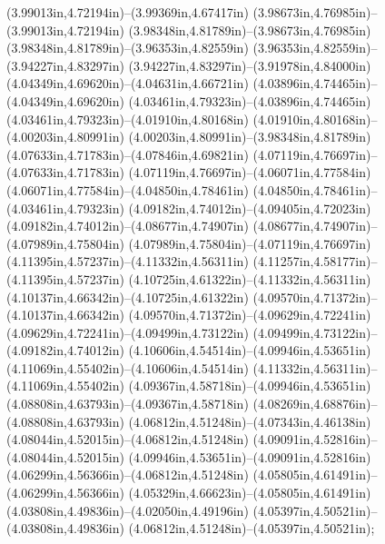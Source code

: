 (3.99013in,4.72194in)--(3.99369in,4.67417in) (3.98673in,4.76985in)--(3.99013in,4.72194in) (3.98348in,4.81789in)--(3.98673in,4.76985in) (3.98348in,4.81789in)--(3.96353in,4.82559in) (3.96353in,4.82559in)--(3.94227in,4.83297in) (3.94227in,4.83297in)--(3.91978in,4.84000in) (4.04349in,4.69620in)--(4.04631in,4.66721in) (4.03896in,4.74465in)--(4.04349in,4.69620in) (4.03461in,4.79323in)--(4.03896in,4.74465in) (4.03461in,4.79323in)--(4.01910in,4.80168in) (4.01910in,4.80168in)--(4.00203in,4.80991in) (4.00203in,4.80991in)--(3.98348in,4.81789in) (4.07633in,4.71783in)--(4.07846in,4.69821in) (4.07119in,4.76697in)--(4.07633in,4.71783in) (4.07119in,4.76697in)--(4.06071in,4.77584in) (4.06071in,4.77584in)--(4.04850in,4.78461in) (4.04850in,4.78461in)--(4.03461in,4.79323in) (4.09182in,4.74012in)--(4.09405in,4.72023in) (4.09182in,4.74012in)--(4.08677in,4.74907in) (4.08677in,4.74907in)--(4.07989in,4.75804in) (4.07989in,4.75804in)--(4.07119in,4.76697in) (4.11395in,4.57237in)--(4.11332in,4.56311in) (4.11257in,4.58177in)--(4.11395in,4.57237in) (4.10725in,4.61322in)--(4.11332in,4.56311in) (4.10137in,4.66342in)--(4.10725in,4.61322in) (4.09570in,4.71372in)--(4.10137in,4.66342in) (4.09570in,4.71372in)--(4.09629in,4.72241in) (4.09629in,4.72241in)--(4.09499in,4.73122in) (4.09499in,4.73122in)--(4.09182in,4.74012in) (4.10606in,4.54514in)--(4.09946in,4.53651in) (4.11069in,4.55402in)--(4.10606in,4.54514in) (4.11332in,4.56311in)--(4.11069in,4.55402in) (4.09367in,4.58718in)--(4.09946in,4.53651in) (4.08808in,4.63793in)--(4.09367in,4.58718in) (4.08269in,4.68876in)--(4.08808in,4.63793in) (4.06812in,4.51248in)--(4.07343in,4.46138in) (4.08044in,4.52015in)--(4.06812in,4.51248in) (4.09091in,4.52816in)--(4.08044in,4.52015in) (4.09946in,4.53651in)--(4.09091in,4.52816in) (4.06299in,4.56366in)--(4.06812in,4.51248in) (4.05805in,4.61491in)--(4.06299in,4.56366in) (4.05329in,4.66623in)--(4.05805in,4.61491in) (4.03808in,4.49836in)--(4.02050in,4.49196in) (4.05397in,4.50521in)--(4.03808in,4.49836in) (4.06812in,4.51248in)--(4.05397in,4.50521in);
